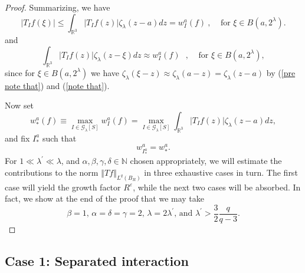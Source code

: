 \documentclass{amsart}%
\theoremstyle{plain}
\numberwithin{equation}{section}
\begin{document}
\begin{proof}
Summarizing, we have%
\begin{equation}
\left\vert T_{I}f\left(  \xi\right)  \right\vert \leq\int_{\mathbb{R}^{3}%
}\left\vert T_{I}f\left(  z\right)  \right\vert \zeta_{\lambda}\left(
z-a\right)  dz=w_{I}^{a}\left(  f\right)  \ ,\ \ \ \ \ \text{for }\xi\in
B\left(  a,2^{\lambda}\right)  .\label{pre exclaim'}%
\end{equation}
and
\begin{equation}
\int_{\mathbb{R}^{3}}\left\vert T_{I}f\left(  z\right)  \right\vert
\zeta_{\lambda}\left(  z-\xi\right)  dz\approx w_{I}^{a}\left(  f\right)
\text{ },\ \ \ \ \ \text{for }\xi\in B\left(  a,2^{\lambda}\right)
,\label{exclaim'}%
\end{equation}
since for $\xi\in B\left(  a,2^{\lambda}\right)  $ we have $\zeta_{\lambda
}\left(  \xi-z\right)  \approx\zeta_{\lambda}\left(  a-z\right)
=\zeta_{\lambda}\left(  z-a\right)  $ by (\ref{pre note that}) and
(\ref{note that}).

Now set%
\[
w_{\ast}^{a}\left(  f\right)  \equiv\max_{I\in\mathcal{G}_{\lambda}\left[
S\right]  }w_{I}^{a}\left(  f\right)  =\max_{I\in\mathcal{G}_{\lambda}\left[
S\right]  }\int_{\mathbb{R}^{3}}\left\vert T_{I}f\left(  z\right)  \right\vert
\zeta_{\lambda}\left(  z-a\right)  dz,
\]
and fix $I_{\ast}^{a}$ such that
\[
w_{I_{\ast}^{a}}^{a}=w_{\ast}^{a}.
\]
For $1\ll\lambda^{\prime}\ll\lambda$, and $\alpha,\beta,\gamma,\delta
\in\mathbb{N}$ chosen appropriately, we will estimate the contributions to the
norm $\left\Vert Tf\right\Vert _{L^{q}\left(  B_{R}\right)  }$ in three
exhaustive cases in turn. The first case will yield the growth factor
$R^{\varepsilon}$, while the next two cases will be absorbed. In fact, we show
at the end of the proof that we may take%
\[
\beta=1\text{, \ \ \ \ }\alpha=\delta=\gamma=2\text{, \ \ \ \ }\lambda
=2\lambda^{\prime}\text{, \ \ \ \ and }\lambda^{\prime}>\frac{3}{2}\frac
{q}{q-3}.
\]

\end{proof}

\subsection{Case 1: Separated interaction\label{Sub Case 1}}
\end{document}
